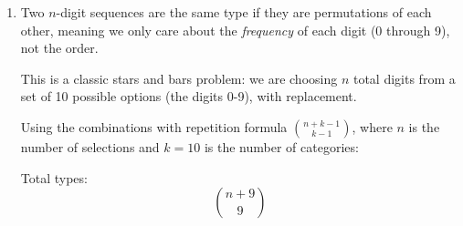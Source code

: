 \documentclass[11pt]{article}
\begin{document}
\begin{enumerate}[label=\textbf{(\alph*)}]
    This yields the double factorial $(2n-1)!!$. We can rewrite this using standard factorials by multiplying the numerator and denominator by the even terms $(2n \cdot (2n-2) \dots 2) = 2^n \cdot n!$.
    
    Total ways:
    $$\frac{(2n)!}{n!2^n}$$

    \item Two $n$-digit sequences are the same type if they are permutations of each other, meaning we only care about the \textit{frequency} of each digit (0 through 9), not the order. 
    
    This is a classic stars and bars problem: we are choosing $n$ total digits from a set of 10 possible options (the digits 0-9), with replacement. 
    
    Using the combinations with repetition formula $\binom{n + k - 1}{k - 1}$, where $n$ is the number of selections and $k = 10$ is the number of categories:
    
    Total types:
    $$\binom{n + 9}{9}$$
\end{enumerate}
\end{document}

